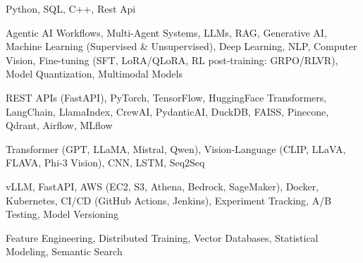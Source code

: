 \documentclass[letter,10pt]{article}
\begin{document}
 Python, SQL, C++, Rest Api\par\vspace{2pt}

 Agentic AI Workflows, Multi-Agent Systems, LLMs, RAG, Generative AI, Machine Learning (Supervised \& Unsupervised), Deep Learning, NLP, Computer Vision, Fine-tuning (SFT, LoRA/QLoRA, RL post-training: GRPO/RLVR), Model Quantization, Multimodal Models\par\vspace{2pt}

 REST APIs (FastAPI), PyTorch, TensorFlow, HuggingFace Transformers, LangChain, LlamaIndex, CrewAI, PydanticAI, DuckDB, FAISS, Pinecone, Qdrant, Airflow, MLflow\par\vspace{2pt}

 Transformer (GPT, LLaMA, Mistral, Qwen), Vision-Language (CLIP, LLaVA, FLAVA, Phi-3 Vision), CNN, LSTM, Seq2Seq\par\vspace{2pt}

 vLLM, FastAPI, AWS (EC2, S3, Athena, Bedrock, SageMaker), Docker, Kubernetes, CI/CD (GitHub Actions, Jenkins), Experiment Tracking, A/B Testing, Model Versioning\par\vspace{2pt}

 Feature Engineering, Distributed Training, Vector Databases, Statistical Modeling, Semantic Search
\end{document}
